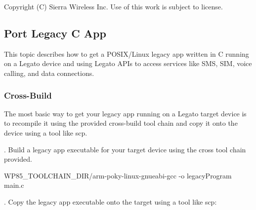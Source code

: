 Copyright (C) Sierra Wireless Inc. Use of this work is subject to license. \hypertarget{howToPortLegacyC}{}\subsection{Port Legacy C App}\label{howToPortLegacyC}
This topic describes how to get a P\+O\+S\+I\+X/\+Linux legacy app written in C running on a Legato device and using Legato A\+P\+Is to access services like S\+M\+S, S\+I\+M, voice calling, and data connections.

\hypertarget{how_to_port_legacy_c_howtoPortingLegacyC_CrossBuild}{}\subsubsection{Cross-\/\+Build}\label{how_to_port_legacy_c_howtoPortingLegacyC_CrossBuild}
The most basic way to get your legacy app running on a Legato target device is to recompile it using the provided cross-\/build tool chain and copy it onto the device using a tool like {\ttfamily scp}.

{}. Build a legacy app executable for your target device using the cross tool chain provided.


\begin{DoxyCode}
$ $WP85\_TOOLCHAIN\_DIR/arm-poky-linux-gnueabi-gcc -o legacyProgram main.c
\end{DoxyCode}


{}. Copy the legacy app executable onto the target using a tool like {\ttfamily scp\+:} 




